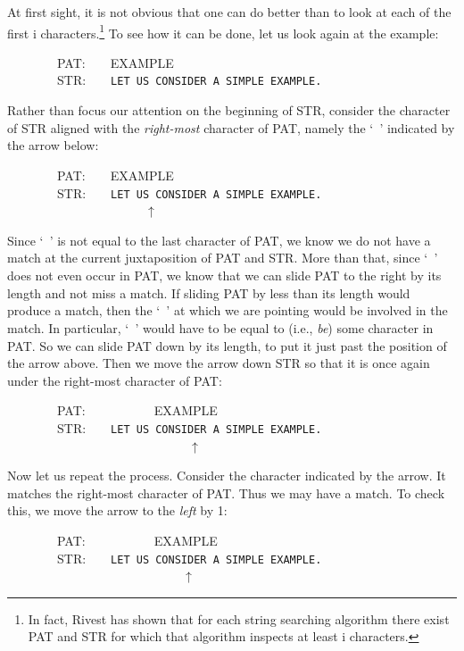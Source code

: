 \documentclass[11pt]{book}
\newenvironment{pubasis}{\begin{flushleft}\ttfamily\small}{\normalsize\rmfamily\end{flushleft}}
\newcommand{\pubinlineunderline}[1]{\emph{#1}}
\begin{document}
At first sight, it is not obvious that one can do better than to look at
each of the first i characters.\footnote{In fact, Rivest \cite{RIVEST} has shown that for each string searching algorithm there exist PAT and STR for which that algorithm inspects at least i characters.}
To see how it can be done, let us look again
at the example:
\begin{pubasis}
~~~~~~~~PAT:~~~~EXAMPLE\\
~~~~~~~~STR:~~~~\verb*+LET US CONSIDER A SIMPLE EXAMPLE.+\\
\end{pubasis}
Rather than focus our attention on the beginning of STR, consider
the character of STR aligned with the \pubinlineunderline{right-most} character of PAT,
namely the `\verb*+ +' indicated by the arrow below:
\begin{pubasis}
~~~~~~~~PAT:~~~~EXAMPLE\\
~~~~~~~~STR:~~~~\verb*+LET US CONSIDER A SIMPLE EXAMPLE.+\\
~~~~~~~~~~~~~~~~~~~~~~$\uparrow$\\
\end{pubasis}
Since `\verb*+ +' is not equal to the last character of PAT, we know we do not have
a match at the current juxtaposition of PAT and STR.  More than
that, since `\verb*+ +' does not even occur in PAT, we know that we can slide
PAT to the right by its length and not miss a match.  If sliding PAT by
less than its length would produce a match, then the `\verb*+ +' at which we
are pointing would be involved in the match.  In particular, `\verb*+ +' would
have to be equal to (i.e., \pubinlineunderline{be}) some character
in PAT.  So we can slide PAT down by its length, to put it
just past the position of the arrow above.  Then we move the arrow down STR so that it
is once again under the right-most character of PAT:
\begin{pubasis}
~~~~~~~~PAT:~~~~~~~~~~~EXAMPLE\\
~~~~~~~~STR:~~~~\verb*+LET US CONSIDER A SIMPLE EXAMPLE.+\\
~~~~~~~~~~~~~~~~~~~~~~~~~~~~~$\uparrow$\\
\end{pubasis}
Now let us repeat the process.  Consider the character indicated by the
arrow.  It matches the right-most character of PAT.  Thus we may have a match.
To check this, we move the arrow to the \pubinlineunderline{left} by 1:
\begin{pubasis}
~~~~~~~~PAT:~~~~~~~~~~~EXAMPLE\\
~~~~~~~~STR:~~~~\verb*+LET US CONSIDER A SIMPLE EXAMPLE.+\\
~~~~~~~~~~~~~~~~~~~~~~~~~~~~$\uparrow$\\
\end{pubasis}
\end{document}
